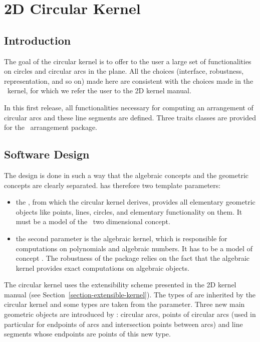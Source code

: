 \chapter{2D Circular Kernel}
\label{chapter-circular-kernel}

\minitoc

\section{Introduction}

The goal of the circular kernel is to offer to the user a large set of
functionalities on circles and circular arcs in the plane. All the
choices (interface, robustness, representation, and so on) made here
are consistent with the choices made in the \cgal\ kernel, for which we
refer the user to the 2D kernel manual. 

In this first release, all functionalities necessary for computing an
arrangement of circular arcs and these line segments are
defined. Three traits classes are provided for the \cgal\ arrangement
package. 

\section{Software Design}

The design is done in such a way that the algebraic concepts and the
geometric concepts are clearly separated. 
has therefore two template parameters: 
\begin{itemize}
\item {} the , from which the circular kernel derives,
provides all elementary geometric objects like points, lines, circles, and
elementary functionality on them. It must be a model of the \cgal\ two 
dimensional  concept.
\item {} the second parameter is the algebraic kernel, which is 
responsible for computations on polynomials and algebraic numbers. It 
has to be a model of concept . The
robustness of the package relies on the fact that the algebraic kernel
provides exact computations on algebraic objects.
\end{itemize}

The circular kernel uses the extensibility scheme presented in the 2D
kernel manual (see Section~\ref{section-extensible-kernel}). 
The types of  are inherited
by the circular kernel and some types are taken from the
 parameter. Three new main geometric objects are
introduced by : circular arcs, points of
circular arcs (used in particular for endpoints of arcs and
intersection points between arcs) and line segments whose endpoints
are points of this new type.  

